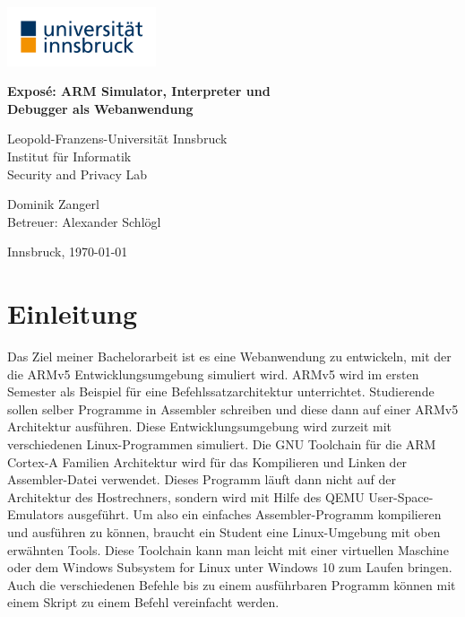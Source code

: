 \documentclass[a4paper, 11pt, onecolumn]{article}
\providecommand{\keywords}[1]
{
  \noindent \textbf{Schlüsselwörter } #1
}
\begin{document}
\renewcommand{\abstractname}{Kurzfassung}
    \begin{center}

        \includegraphics[width=0.33\textwidth]{data/uibk} 
        
		\LARGE
        \textbf{Exposé: ARM Simulator, Interpreter und\\Debugger als Webanwendung\\}
        
		\vspace{0.2cm}        
            
        \large
        Leopold-Franzens-Universität Innsbruck\\
        Institut für Informatik\\
		Security and Privacy Lab
		
		\vspace{0.4cm}   
		
		\Large  
        Dominik Zangerl\\
		Betreuer: Alexander Schlögl  
                
        \vspace{0.4cm}
        
        \large    
        Innsbruck, \today
           
    \end{center}
    
%
%
%

\section{Einleitung}

Das Ziel meiner Bachelorarbeit ist es eine Webanwendung zu entwickeln, mit der die ARMv5 Entwicklungsumgebung simuliert wird. ARMv5 \cite{arm:2005} wird im ersten Semester als Beispiel für eine Befehlssatzarchitektur unterrichtet. Studierende sollen selber Programme in Assembler schreiben und diese dann auf einer ARMv5 Architektur ausführen. Diese Entwicklungsumgebung wird zurzeit mit verschiedenen Linux-Programmen simuliert. Die GNU Toolchain für die ARM Cortex-A Familien Architektur \cite{gnutoolchain} wird für das Kompilieren und Linken der Assembler-Datei verwendet. Dieses Programm läuft dann nicht auf der Architektur des Hostrechners, sondern wird mit Hilfe des QEMU User-Space-Emulators \cite{qemu} ausgeführt. Um also ein einfaches Assembler-Programm kompilieren und ausführen zu können, braucht ein Student eine Linux-Umgebung mit oben erwähnten Tools. Diese Toolchain kann man leicht mit einer virtuellen Maschine oder dem Windows Subsystem for Linux \cite{wsl} unter Windows 10 zum Laufen bringen. Auch die verschiedenen Befehle bis zu einem ausführbaren Programm können mit einem Skript zu einem Befehl vereinfacht werden.
\end{document}
